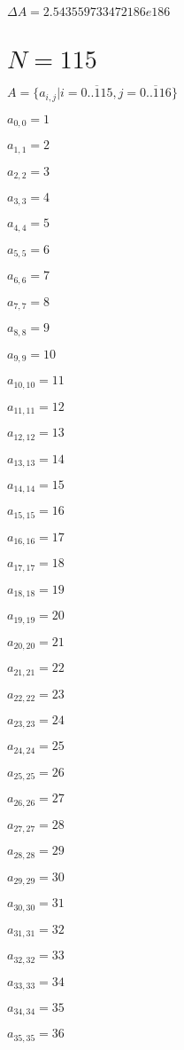 \documentclass[a4paper,12pt]{article}
\begin{document}
$\Delta A = 2.543559733472186e186$



\section{ $N = 115$ }
$A = \{ a _{ i, j } | i = \overline { 0..115 }, j = \overline { 0..116 } \}$

$a _{ 0, 0 } = 1$

$a _{ 1, 1 } = 2$

$a _{ 2, 2 } = 3$

$a _{ 3, 3 } = 4$

$a _{ 4, 4 } = 5$

$a _{ 5, 5 } = 6$

$a _{ 6, 6 } = 7$

$a _{ 7, 7 } = 8$

$a _{ 8, 8 } = 9$

$a _{ 9, 9 } = 10$

$a _{ 10, 10 } = 11$

$a _{ 11, 11 } = 12$

$a _{ 12, 12 } = 13$

$a _{ 13, 13 } = 14$

$a _{ 14, 14 } = 15$

$a _{ 15, 15 } = 16$

$a _{ 16, 16 } = 17$

$a _{ 17, 17 } = 18$

$a _{ 18, 18 } = 19$

$a _{ 19, 19 } = 20$

$a _{ 20, 20 } = 21$

$a _{ 21, 21 } = 22$

$a _{ 22, 22 } = 23$

$a _{ 23, 23 } = 24$

$a _{ 24, 24 } = 25$

$a _{ 25, 25 } = 26$

$a _{ 26, 26 } = 27$

$a _{ 27, 27 } = 28$

$a _{ 28, 28 } = 29$

$a _{ 29, 29 } = 30$

$a _{ 30, 30 } = 31$

$a _{ 31, 31 } = 32$

$a _{ 32, 32 } = 33$

$a _{ 33, 33 } = 34$

$a _{ 34, 34 } = 35$

$a _{ 35, 35 } = 36$
\end{document}
